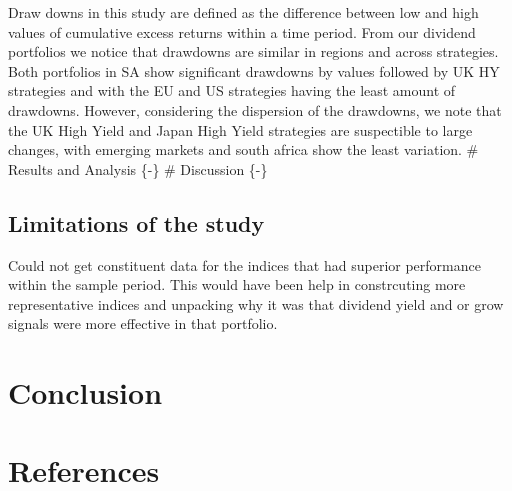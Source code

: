 \documentclass[11pt,preprint, authoryear]{elsarticle}
\numberwithin{equation}{section}
\numberwithin{figure}{section}
\numberwithin{table}{section}
\begin{document}
Draw downs in this study are defined as the difference between low and
high values of cumulative excess returns within a time period. From our
dividend portfolios we notice that drawdowns are similar in regions and
across strategies. Both portfolios in SA show significant drawdowns by
values followed by UK HY strategies and with the EU and US strategies
having the least amount of drawdowns. However, considering the
dispersion of the drawdowns, we note that the UK High Yield and Japan
High Yield strategies are suspectible to large changes, with emerging
markets and south africa show the least variation. \# Results and
Analysis \{-\} \# Discussion \{-\}

\hypertarget{limitations-of-the-study}{%
\subsection*{Limitations of the study}\label{limitations-of-the-study}}

Could not get constituent data for the indices that had superior
performance within the sample period. This would have been help in
constrcuting more representative indices and unpacking why it was that
dividend yield and or grow signals were more effective in that
portfolio.

\hypertarget{conclusion}{%
\section*{Conclusion}\label{conclusion}}

\newpage

\hypertarget{references}{%
\section*{References}\label{references}}
\end{document}

